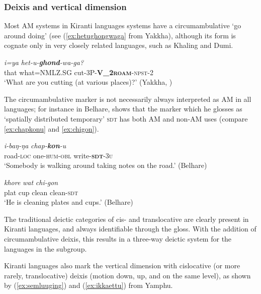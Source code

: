 \documentclass[oneside,a4paper,11pt]{article}
\newcommand{\ipa}[1]{{\phon\textit{#1}}}
\newcommand{\sens}[1]{‘#1’}
\newcommand{\rouge}[1]{\textbf{#1}}
\begin{document}
 \subsubsection{Deixis and vertical dimension} \label{sec:vertical.khaling}
  Most AM systems in Kiranti languages systems have a circumambulative `go around doing' (see (\ref{ex:hetughongwaga} from Yakkha), although its form is cognate only in very closely related languages, such as Khaling and Dumi.   
  
  \begin{exe}
\ex \label{ex:hetughongwaga}
 \gll  \ipa{ŋkha}	\ipa{i=ya}	\ipa{het-u-\rouge{ghond}-wa-ga?} \\
that what=NMLZ.SG cut-3P-\rouge{V_2\textsc{roam}}-\textsc{npst}-2  \\
\glt \sens{What are you cutting (at various places)?} (Yakkha, \citealt[326]{schackow15yakkha})
\end{exe}
 
The circumambulative marker is not necessarily always interpreted as AM in all languages; for instance in Belhare, \citet[164]{bickel96aspect} shows that the marker which he glosses as `spatially distributed temporary' \textsc{sdt}  has both AM and non-AM uses (compare \ref{ex:chapkonu} and \ref{ex:chigon}). 
 
 \begin{exe}
\ex \label{ex:chapkonu}  
\gll \ipa{rot-de} \ipa{i-baŋ-ŋa} \ipa{chap-\rouge{kon}-u}  \\
road-\textsc{loc} one-\textsc{hum}-\textsc{obl} write-\textsc{\rouge{sdt}}-\textsc{3u} \\
\glt \sens{Somebody is walking around taking notes on the road.}  (Belhare)
\end{exe}

 \begin{exe}
\ex \label{ex:chigon}
\gll \ipa{thali} \ipa{khore} \ipa{wat} \ipa{chi-gon}    \\
plat cup clean clean-\textsc{sdt} \\
\glt \sens{He is cleaning plates and cups.} (Belhare)
\end{exe}


The traditional deictic categories of cis- and translocative are clearly present in Kiranti languages, and always identifiable through the gloss.  With the addition of circumambulative deixis, this results in a three-way deictic system for the languages in the subgroup.

Kiranti languages also mark the vertical dimension with cislocative (or more rarely, translocative) deixis (motion down, up, and on the same level), as shown by (\ref{ex:semluuging}) and (\ref{ex:ikkaettu}) from Yamphu.
 
\end{document}
